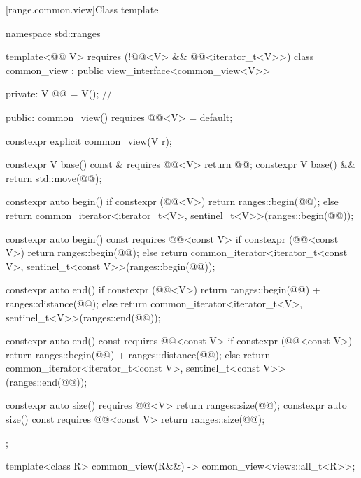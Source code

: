 [range.common.view]{Class template }

%
%
%
%
%
\begin{codeblock}
namespace std::ranges {
  template<@@ V>
    requires (!@@<V> && @@<iterator_t<V>>)
  class common_view : public view_interface<common_view<V>> {
  private:
    V @@ = V();  // \expos

  public:
    common_view() requires @@<V> = default;

    constexpr explicit common_view(V r);

    constexpr V base() const & requires @@<V> { return @@; }
    constexpr V base() && { return std::move(@@); }

    constexpr auto begin() {
      if constexpr (@@<V>)
        return ranges::begin(@@);
      else
        return common_iterator<iterator_t<V>, sentinel_t<V>>(ranges::begin(@@));
    }

    constexpr auto begin() const requires @@<const V> {
      if constexpr (@@<const V>)
        return ranges::begin(@@);
      else
        return common_iterator<iterator_t<const V>, sentinel_t<const V>>(ranges::begin(@@));
    }

    constexpr auto end() {
      if constexpr (@@<V>)
        return ranges::begin(@@) + ranges::distance(@@);
      else
        return common_iterator<iterator_t<V>, sentinel_t<V>>(ranges::end(@@));
    }

    constexpr auto end() const requires @@<const V> {
      if constexpr (@@<const V>)
        return ranges::begin(@@) + ranges::distance(@@);
      else
        return common_iterator<iterator_t<const V>, sentinel_t<const V>>(ranges::end(@@));
    }

    constexpr auto size() requires @@<V> {
      return ranges::size(@@);
    }
    constexpr auto size() const requires @@<const V> {
      return ranges::size(@@);
    }
  };

  template<class R>
    common_view(R&&) -> common_view<views::all_t<R>>;
}
\end{codeblock}

